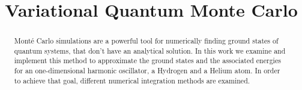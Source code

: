 \documentclass[conference]{IEEEtran}
\begin{document}
\title{Variational Quantum Monte Carlo}


\author{
\and
{}
\and
{}
}


\maketitle


\begin{abstract}

Mont\'e Carlo simulations are a powerful tool for numerically finding ground states of quantum systems, that don't have an analytical solution. In this work we examine and implement this method to approximate the ground states and the associated energies for an one-dimensional harmonic oscillator, a Hydrogen and a Helium atom. In order to achieve that goal, different numerical integration methods are examined.

\end{abstract}

\IEEEpeerreviewmaketitle















\end{document}
